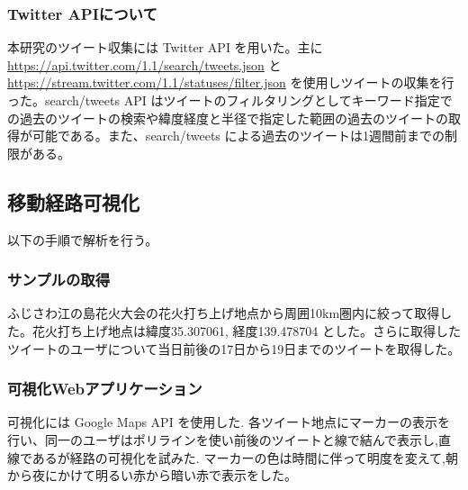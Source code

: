 \subsubsection{Twitter APIについて}
本研究のツイート収集には Twitter API を用いた。主に \url{https://api.twitter.com/1.1/search/tweets.json} と \url{https://stream.twitter.com/1.1/statuses/filter.json} を使用しツイートの収集を行った。search/tweets API はツイートのフィルタリングとしてキーワード指定での過去のツイートの検索や緯度経度と半径で指定した範囲の過去のツイートの取得が可能である。また、search/tweets による過去のツイートは1週間前までの制限がある。

\subsection{移動経路可視化}
以下の手順で解析を行う。

\subsubsection{サンプルの取得}
ふじさわ江の島花火大会の花火打ち上げ地点から周囲10km圏内に絞って取得した。花火打ち上げ地点は緯度35.307061, 経度139.478704 とした。さらに取得したツイートのユーザについて当日前後の17日から19日までのツイートを取得した。


\subsubsection{可視化Webアプリケーション}
可視化には Google Maps API \cite{webpage_googlemapapi} を使用した.
各ツイート地点にマーカーの表示を行い、同一のユーザはポリラインを使い前後のツイートと線で結んで表示し,直線であるが経路の可視化を試みた.
マーカーの色は時間に伴って明度を変えて,朝から夜にかけて明るい赤から暗い赤で表示をした。


